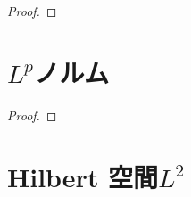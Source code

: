 \documentclass[report]{jlreq}
\begin{document}
\begin{proof}
    \TODO{}
\end{proof}

%
\section{$L^p$ノルム}

\begin{theorem}
    \TODO{}
\end{theorem}

\begin{proof}
    \TODO{}
\end{proof}

%
\section{Hilbert 空間$L^2$}
\end{document}

